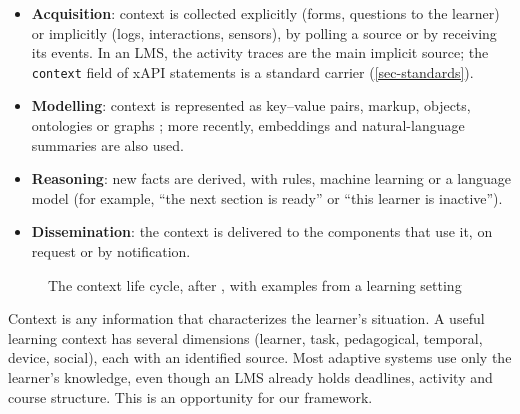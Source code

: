 \begin{itemize}
  \item \textbf{Acquisition}: context is collected explicitly (forms,
        questions to the learner) or implicitly (logs, interactions,
        sensors), by polling a source or by receiving its events. In an
        LMS, the activity traces are the main implicit source; the
        \texttt{context} field of xAPI statements is a standard carrier
        (\cref{sec-standards}).
  \item \textbf{Modelling}: context is represented as key--value pairs,
        markup, objects, ontologies or graphs \cite{strang2004,bettini2010};
        more recently, embeddings and natural-language summaries are also
        used.
  \item \textbf{Reasoning}: new facts are derived, with rules, machine
        learning or a language model (for example, \enquote{the next
        section is ready} or \enquote{this learner is inactive}).
  \item \textbf{Dissemination}: the context is delivered to the components
        that use it, on request or by notification.
\end{itemize}

\begin{figure}[htbp]
\centering
{}
\caption[The context life cycle]{The context life cycle, after
\citet{perera2014}, with examples from a learning setting}
\label{fig-context-lifecycle}
\end{figure}

\begin{summarybox}[Takeaway]
Context is any information that characterizes the learner's situation. A
useful learning context has several dimensions (learner, task,
pedagogical, temporal, device, social), each with an identified source.
Most adaptive systems use only the learner's knowledge, even though an LMS
already holds deadlines, activity and course structure. This is an
opportunity for our framework.
\end{summarybox}

